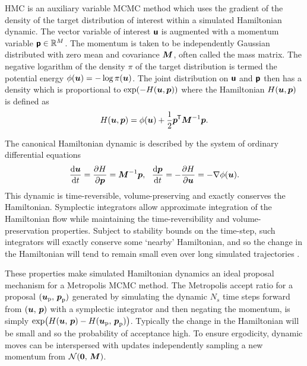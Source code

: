 \ac{HMC} \citep{duane1987hybrid,neal2011mcmc} is an auxiliary variable \ac{MCMC} method which uses the gradient of the density of the target distribution of interest within a simulated Hamiltonian dynamic. The vector variable of interest $\boldsymbol{\mathsf{u}}$ is augmented with a momentum variable $\boldsymbol{\mathsf{p}} \in \mathit{\mathbb{R}}^M$. The momentum is taken to be independently Gaussian distributed with zero mean and covariance $\boldsymbol{M}$, often called the mass matrix. The negative logarithm of the density $\pi$ of the target distribution is termed the potential energy $\phi(\boldsymbol{u}) = -\log\pi(\boldsymbol{u})$. The joint distribution on $\boldsymbol{\mathsf{u}}$ and $\boldsymbol{\mathsf{p}}$ then has a density which is proportional to $\exp\lpa -H(\vct{u}, \vct{p})\rpa$ where the {Hamiltonian} $H(\boldsymbol{u},\boldsymbol{p})$ is defined as 
\begin{equation}\label{eq:hamiltonian}
    H(\boldsymbol{u}, \boldsymbol{p}) = 
    \phi(\boldsymbol{u}) + \frac{1}{2}\boldsymbol{p}^{\mkern-1.5mu\mathsf{T}}\boldsymbol{M}^{-1}\boldsymbol{p}.
\end{equation}

The canonical Hamiltonian dynamic is described by the system of ordinary differential equations
\begin{equation}\label{eq:hamiltonian_dynamics}
    \td{\vct{u}}{t} = \pd{H}{\vct{p}} = \mtx{M}^{-1}\vct{p},
    ~~
    \td{\vct{p}}{t} = -\pd{H}{\vct{u}} = -\grad{\phi}{\vct{u}}.
\end{equation}
This dynamic is time-reversible, volume-preserving and exactly conserves the Hamiltonian. Symplectic integrators allow approximate integration of the Hamiltonian flow while maintaining the time-reversibility and volume-preservation properties. Subject to stability bounds on the time-step, such integrators will exactly conserve some `nearby' Hamiltonian, and so the change in the Hamiltonian will tend to remain small even over long simulated trajectories \citep{leimkuhler2004simulating}. 

These properties make simulated Hamiltonian dynamics an ideal proposal mechanism for a Metropolis \ac{MCMC} method. The Metropolis accept ratio for a proposal $(\boldsymbol{u}_{\text{p}},\,\boldsymbol{p}_{\text{p}})$ generated by simulating the dynamic $N_s$ time steps forward from $(\boldsymbol{u},\, \boldsymbol{p})$ with a symplectic integrator and then negating the momentum, is simply $\exp\lpa H(\vct{u},\,\vct{p}) - H(\vct{u}_{\text{p}},\,\vct{p}_{\text{p}})\rpa$. Typically the change in the Hamiltonian will be small and so the probability of acceptance high. To ensure ergodicity, dynamic moves can be interspersed with updates independently sampling a new momentum from $\nrm{\vct{0},\,\mtx{M}}$.

